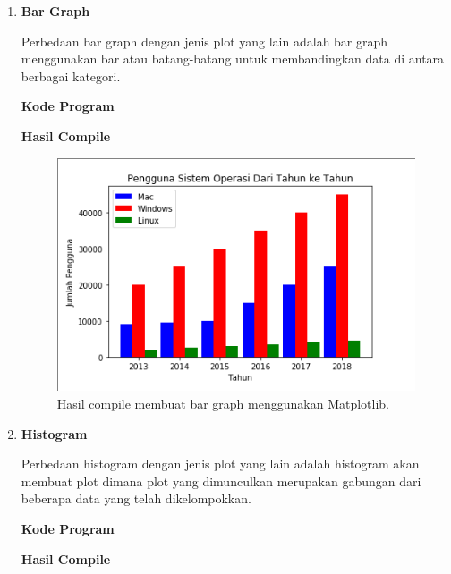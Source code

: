 \begin{enumerate}
	\item \textbf{Bar Graph}
	
	Perbedaan bar graph dengan jenis plot yang lain adalah bar graph menggunakan bar atau batang-batang untuk membandingkan data di antara berbagai kategori.
	
	\textbf{Kode Program}
	
	
	
	\textbf{Hasil Compile}
	
	\begin{figure}[H]
		\includegraphics[width=12cm]{figures/6/1174089/Praktek/bar.png}
		\centering
		\caption{Hasil compile membuat bar graph menggunakan Matplotlib.}
	\end{figure}
	
	\item \textbf{Histogram}
	
	Perbedaan histogram dengan jenis plot yang lain adalah histogram akan membuat plot dimana plot yang dimunculkan merupakan gabungan dari beberapa data yang telah dikelompokkan.
	
	\textbf{Kode Program}
	
	
	
	\textbf{Hasil Compile}
	

\end{enumerate}
